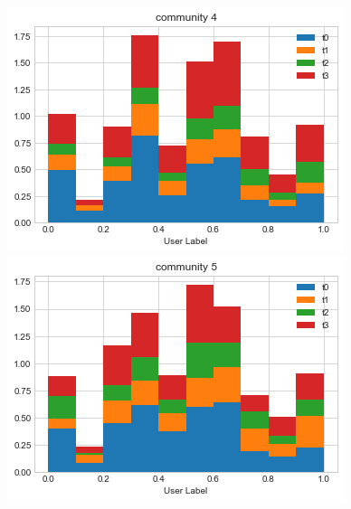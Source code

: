 \documentclass[sigchi]{acmart}
\begin{document}
\begin{figure}[h]
\begin{minipage}[b]{.48\linewidth}
\centering\includegraphics[width=0.9\linewidth]{report/img/community_distribution_4.png}
\end{minipage}
\begin{minipage}[b]{.48\linewidth}
\centering\includegraphics[width=0.9\linewidth]{report/img/community_distribution_5.png}
\end{minipage}


\end{figure}
\end{document}

